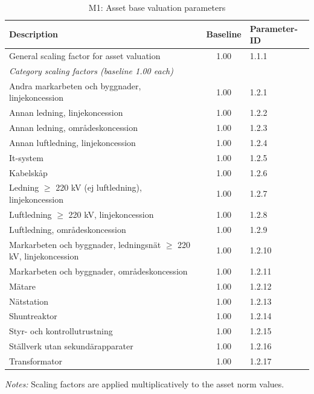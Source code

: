 \begin{table}[H]
\centering
\begin{singlespace}
\footnotesize
\begin{threeparttable}
\caption{M1: Asset base valuation parameters}
\label{tab:app-m1}
\begin{tabular}{@{}p{9cm}cl@{}}
\toprule
\textbf{Description} & \textbf{Baseline} & \textbf{Parameter-ID} \\
\midrule
General scaling factor for asset valuation & 1.00 & 1.1.1 \\
\midrule
\multicolumn{3}{l}{\textit{Category scaling factors (baseline 1.00 each)}} \\
Andra markarbeten och byggnader, linjekoncession & 1.00 & 1.2.1 \\
Annan ledning, linjekoncession & 1.00 & 1.2.2 \\
Annan ledning, områdeskoncession & 1.00 & 1.2.3 \\
Annan luftledning, linjekoncession & 1.00 & 1.2.4 \\
It-system & 1.00 & 1.2.5 \\
Kabelskåp & 1.00 & 1.2.6 \\
Ledning $\geq$ 220 kV (ej luftledning), linjekoncession & 1.00 & 1.2.7 \\
Luftledning $\geq$ 220 kV, linjekoncession & 1.00 & 1.2.8 \\
Luftledning, områdeskoncession & 1.00 & 1.2.9 \\
Markarbeten och byggnader, ledningsnät $\geq$ 220 kV, linjekoncession & 1.00 & 1.2.10 \\
Markarbeten och byggnader, områdeskoncession & 1.00 & 1.2.11 \\
Mätare & 1.00 & 1.2.12 \\
Nätstation & 1.00 & 1.2.13 \\
Shuntreaktor & 1.00 & 1.2.14 \\
Styr- och kontrollutrustning & 1.00 & 1.2.15 \\
Ställverk utan sekundärapparater & 1.00 & 1.2.16 \\
Transformator & 1.00 & 1.2.17 \\
\bottomrule
\end{tabular}
\begin{tablenotes}
\item \textit{Notes:} Scaling factors are applied multiplicatively to the asset norm values.
\end{tablenotes}
\end{threeparttable}
\end{singlespace}
\end{table}

